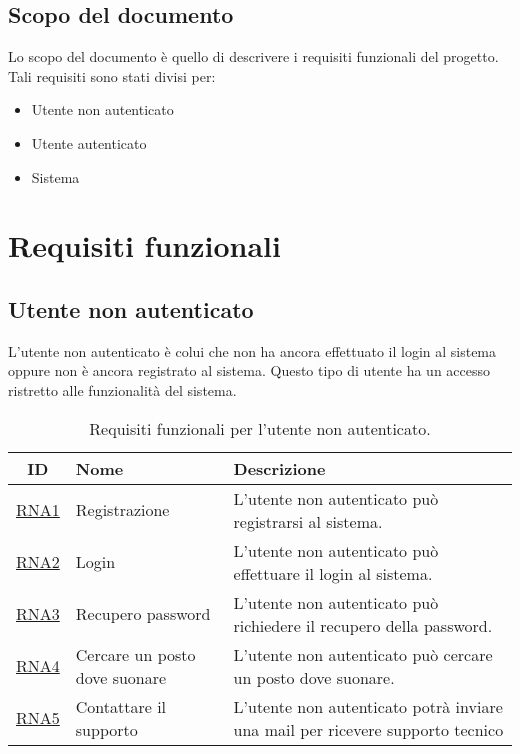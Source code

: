 \documentclass[12pt, a4paper]{article}
\begin{document}
\subsection{Scopo del documento}

Lo scopo del documento è quello di descrivere i requisiti funzionali del progetto.
Tali requisiti sono stati divisi per:
\begin{itemize}
    \item Utente non autenticato
    \item Utente autenticato
    \item Sistema
\end{itemize}

\section{Requisiti funzionali}
\subsection{Utente non autenticato}

L'utente non autenticato è colui che non ha ancora effettuato il login al sistema oppure non è ancora registrato al sistema. Questo tipo di utente ha un accesso ristretto alle funzionalità del sistema.

\begin{table}[h]
    \centering
    \label{tab:requisiti utente non autenticato}
    \begin{tabular}{|c|p{5cm}|p{5cm}|}
        \hline \textbf{ID}            & \textbf{Nome}                 & \textbf{Descrizione}                                                          \\  \hline
        \hline \hyperlink{RNA1}{RNA1} & Registrazione                 & L'utente non autenticato può registrarsi al sistema.                          \\ \hline
        \hline \hyperlink{RNA2}{RNA2} & Login                         & L'utente non autenticato può effettuare il login al sistema.                  \\ \hline
        \hline \hyperlink{RNA3}{RNA3} & Recupero password             & L'utente non autenticato può richiedere il recupero della password.           \\ \hline
        \hline \hyperlink{RNA4}{RNA4} & Cercare un posto dove suonare & L'utente non autenticato può cercare un posto dove suonare.                   \\ \hline
        \hline \hyperlink{RNA5}{RNA5} & Contattare il supporto        & L'utente non autenticato potrà inviare una mail per ricevere supporto tecnico \\ \hline
    \end{tabular}
    \caption{Requisiti funzionali per l'utente non autenticato.}
\end{table}
\end{document}
